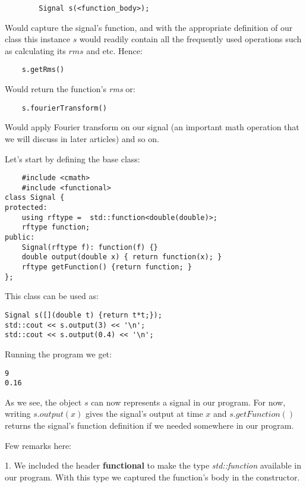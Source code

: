 \documentclass{article}
\begin{document}
	\begin{verbatim}
		Signal s(<function_body>);
	\end{verbatim}
	 
	Would capture the signal's function, and with the appropriate definition of our class this instance $s$ would readily contain all the frequently used operations such as calculating its $rms$ and etc. Hence:
	
	\begin{verbatim}
	s.getRms()
	\end{verbatim}

	Would return the function's \textit{rms} or:
		
	\begin{verbatim}
	s.fourierTransform()
	\end{verbatim}

	Would apply Fourier transform on our signal (an important math operation that we will discuss in later articles) and so on.
		
	Let's start by defining the base class:
	
	\begin{verbatim}
	#include <cmath>
	#include <functional>
class Signal {
protected:
    using rftype =  std::function<double(double)>;
    rftype function;
public:
    Signal(rftype f): function(f) {}
    double output(double x) { return function(x); }
    rftype getFunction() {return function; }
};
	\end{verbatim}
	This class can be used as:
	
	\begin{verbatim}
Signal s([](double t) {return t*t;});
std::cout << s.output(3) << '\n';
std::cout << s.output(0.4) << '\n';
	\end{verbatim}
	Running the program we get:
	
	\begin{verbatim}
9
0.16
	\end{verbatim}
	
	As we see, the object $s$ can now represents a signal in our program. For now, writing $s.output(x)$ gives the signal's output at time $x$ and $s.getFunction()$ returns the signal's function definition if we needed somewhere in our program.
		
	Few remarks here:
	
	1. We included the header \textbf{functional} to make the type \textit{std::function} available in our program. With this type we captured the function's body in the constructor.
\end{document}
